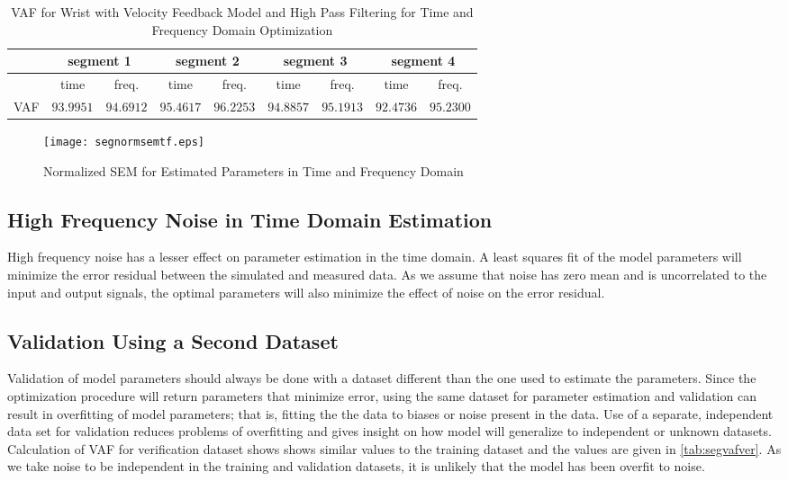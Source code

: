 \documentclass[11pt,a4paper]{article}
\begin{document}
\begin{table}
    \centering
    \begin{tabular}{|l|r|r|r|r|r|r|r|r|}
        \hline
        \nonumber &
            \multicolumn{2}{c|}{segment 1} &
            \multicolumn{2}{c|}{segment 2} &
            \multicolumn{2}{c|}{segment 3} &
            \multicolumn{2}{c|}{segment 4} \\
        \hline
        \nonumber &
            \multicolumn{1}{c|}{time} & \multicolumn{1}{c|}{freq.} &
            \multicolumn{1}{c|}{time} & \multicolumn{1}{c|}{freq.} &
            \multicolumn{1}{c|}{time} & \multicolumn{1}{c|}{freq.} &
            \multicolumn{1}{c|}{time} & \multicolumn{1}{c|}{freq.} \\
        \hline
        VAF &
            $93.9951$ & $94.6912$ & $95.4617$ & $96.2253$ &
            $94.8857$ & $95.1913$ & $92.4736$ & $95.2300$ \\
        \hline
    \end{tabular}
    \caption{VAF for Wrist with Velocity Feedback Model and High Pass
        Filtering for Time and Frequency Domain Optimization}
    \label{tab:segvafhp}
\end{table}

\begin{figure}
    \centering
    \texttt{[image: segnormsemtf.eps]}
    \caption{Normalized SEM for Estimated Parameters in Time and Frequency
        Domain}
    \label{fig:segnormsemtf}
\end{figure}

\subsection{High Frequency Noise in Time Domain Estimation}
High frequency noise has a lesser effect on parameter estimation in the time
domain. A least squares fit of the model parameters will minimize the error
residual between the simulated and measured data. As we assume that noise
has zero mean and is uncorrelated to the input and output signals, the optimal
parameters will also minimize the effect of noise on the error residual.

\subsection{Validation Using a Second Dataset}
Validation of model parameters should always be done with a dataset different
than the one used to estimate the parameters. Since the optimization procedure
will return parameters that minimize error, using the same dataset for
parameter estimation and validation can result in overfitting of model
parameters; that is, fitting the the data to biases or noise present in the
data. Use of a separate, independent data set for validation reduces problems
of overfitting and gives insight on how model will generalize to independent or
unknown datasets. Calculation of VAF for verification dataset shows shows
similar values to the training dataset and the values are given in
\autoref{tab:segvafver}. As we take noise to be independent in the training and
validation datasets, it is unlikely that the model has been overfit to noise.
\end{document}
